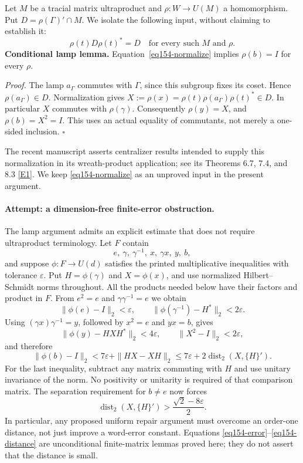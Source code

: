 \documentclass[11pt,a4paper]{article}
\newcommand{\eps}{\varepsilon}
\newcommand{\eref}[2]{\hyperlink{extra:#1:#2}{[E#2]}}
\numberwithin{equation}{section}
\begin{document}
Let $M$ be a tracial matrix ultraproduct and $\rho:W\to U(M)$ a
homomorphism. Put $D=\rho(\Gamma)'\cap M$.
We isolate the following input, without claiming to establish it:
\begin{equation}\label{eq154-normalize}
 \rho(t)D\rho(t)^*=D
 \quad\text{for every such }M\text{ and }\rho.
\end{equation}
\textbf{Conditional lamp lemma.} Equation~\eqref{eq154-normalize} implies
$\rho(b)=I$ for every $\rho$.

\textit{Proof.} The lamp $a_\Gamma$ commutes with $\Gamma$, since this
subgroup fixes its coset. Hence $\rho(a_\Gamma)\in D$. Normalization gives
$X:=\rho(x)=\rho(t)\rho(a_\Gamma)\rho(t)^*\in D$. In particular $X$
commutes with $\rho(\gamma)$. Consequently
$\rho(y)=X$, and $\rho(b)=X^2=I$. This uses an actual equality of
commutants, not merely a one-sided inclusion. \hfill$\square$

The recent manuscript asserts centralizer results intended to supply this
normalization in its wreath-product application; see its Theorems 6.7, 7.4,
and 8.3 \eref{154}{1}. We keep \eqref{eq154-normalize} as an unproved input
in the present argument.

\paragraph{Attempt: a dimension-free finite-error obstruction.}
The lamp argument admits an explicit estimate that does not require
ultraproduct terminology. Let $F$ contain
\[
 e,\ \gamma,\ \gamma^{-1},\ x,\ \gamma x,\ y,\ b,
\]
and suppose $\phi:F\to U(d)$ satisfies the printed multiplicative
inequalities with tolerance $\eps$. Put $H=\phi(\gamma)$ and
$X=\phi(x)$, and use normalized Hilbert--Schmidt norms throughout.
All the products needed below have their factors and product in $F$.
From $e^2=e$ and $\gamma\gamma^{-1}=e$ we obtain
\[
 \|\phi(e)-I\|_2<\eps,\qquad
 \|\phi(\gamma^{-1})-H^*\|_2<2\eps.
\]
Using $(\gamma x)\gamma^{-1}=y$, followed by $x^2=e$ and $yx=b$, gives
\[
 \|\phi(y)-HXH^*\|_2<4\eps,\qquad
 \|X^2-I\|_2<2\eps,
\]
and therefore
\begin{equation}\label{eq154-error}
 \|\phi(b)-I\|_2
 <7\eps+\|HX-XH\|_2
 \le 7\eps+2\operatorname{dist}_2(X,\{H\}').
\end{equation}
For the last inequality, subtract any matrix commuting with $H$ and use
unitary invariance of the norm. No positivity or unitarity is required of
that comparison matrix. The separation requirement for $b\ne e$ now
forces
\begin{equation}\label{eq154-distance}
 \operatorname{dist}_2(X,\{H\}')>
 \frac{\sqrt2-8\eps}{2}.
\end{equation}
In particular, any proposed uniform repair argument must overcome an
order-one distance, not just improve a word-error constant. Equations
\eqref{eq154-error}--\eqref{eq154-distance} are unconditional finite-matrix
lemmas proved here; they do not assert that the distance is small.
\end{document}
